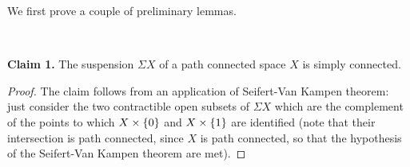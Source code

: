 \documentclass[a4paper,11pt,english]{article}
\begin{document}
\begin{exercise}[2]

We first prove a couple of preliminary lemmas.

\ 

\textbf{Claim 1.} The suspension $\Sigma X$ of a path connected space $X$ is simply connected.

\begin{proof}

The claim follows from an application of Seifert-Van Kampen theorem: just consider the two contractible open subsets of $\Sigma X$ which are the complement of the points to which $X\times\{0\}$ and $X\times\{1\}$ are identified (note that their intersection is path connected, since $X$ is path connected, so that the hypothesis of the Seifert-Van Kampen theorem are met).





\end{proof}


\end{exercise}
\end{document}
